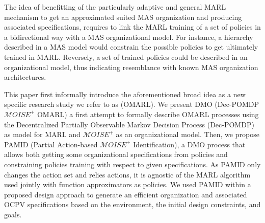 \documentclass[runningheads]{llncs}
\begin{document}

The idea of benefitting of the particularly adaptive and general MARL mechanism to get an approximated suited MAS organization and producing associated specifications, requires to link the MARL training of a set of policies in a bidirectional way with a MAS organizational model. For instance, a hierarchy described in a MAS model would constrain the possible policies to get ultimately trained in MARL. Reversely, a set of trained policies could be described in an organizational model, thus indicating resemblance with known MAS organization architectures.


This paper first informally introduce the aforementioned broad idea as a new specific research study we refer to as  (OMARL). We present DMO (Dec-POMDP $\mathcal{M}OISE^+$ OMARL) a first attempt to formally describe OMARL processes using the Decentralized Partially Observable Markov Decision Process (Dec-POMDP) as model for MARL and $\mathcal{M}OISE^+$ as an organizational model. Then, we propose PAMID (Partial Action-based $\mathcal{M}OISE^+$ Identification), a DMO process that allows both getting some organizational specifications from  policies and constraining policies training with respect to given specifications. As PAMID only changes the action set and relies  actions, it is agnostic of the MARL algorithm used jointly with function approximators as policies. We used PAMID within a proposed design approach to generate an efficient organization and associated OCPV specifications based on the environment, the initial design constraints, and goals.
\end{document}
